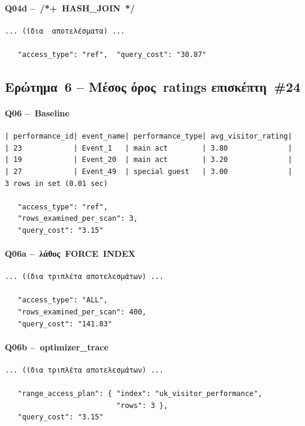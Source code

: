 \documentclass[a4paper,12pt]{article}
\begin{document}
\paragraph{Q04d – /*+ HASH\_JOIN */}
\begin{lstlisting}
... (ίδια  αποτελέσματα) ...

   "access_type": "ref",  "query_cost": "30.87"
\end{lstlisting}


\subsection*{Ερώτημα 6 – Μέσος όρος ratings επισκέπτη \#24}

\paragraph{Q06  – Baseline}
\begin{lstlisting}
| performance_id| event_name| performance_type| avg_visitor_rating|
| 23            | Event_1   | main act        | 3.80              |
| 19            | Event_20  | main act        | 3.20              |
| 27            | Event_49  | special guest   | 3.00              |
3 rows in set (0.01 sec)

   "access_type": "ref",
   "rows_examined_per_scan": 3,
   "query_cost": "3.15"
\end{lstlisting}

\paragraph{Q06a – λάθος FORCE INDEX}
\begin{lstlisting}
... (ίδια τριπλέτα αποτελεσμάτων) ...

   "access_type": "ALL",
   "rows_examined_per_scan": 400,
   "query_cost": "141.83"
\end{lstlisting}

\paragraph{Q06b – optimizer\_trace}
\begin{lstlisting}
... (ίδια τριπλέτα αποτελεσμάτων) ...

   "range_access_plan": { "index": "uk_visitor_performance",
                          "rows": 3 },
   "query_cost": "3.15"
\end{lstlisting}
\end{document}
